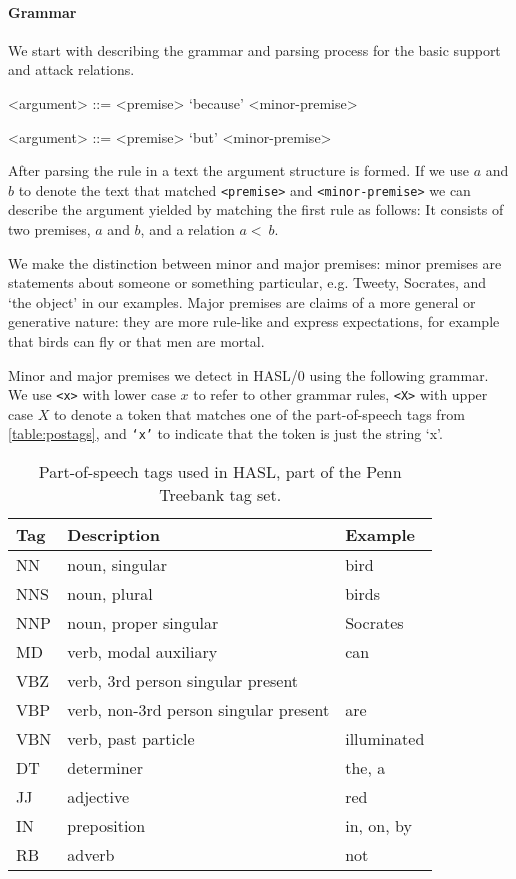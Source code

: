 \paragraph{Grammar} We start with describing the grammar and parsing process for the basic support and attack relations.

\begin{grammar}
<argument> ::= <premise> `because' <minor-premise> %

<argument> ::= <premise> `but' <minor-premise> %
\end{grammar}

\noindent After parsing the rule in a text the argument structure is formed. If we use $a$ and $b$ to denote the text that matched \texttt{<premise>} and \texttt{<minor-premise>} we can describe the argument yielded by matching the first rule as follows: It consists of two premises, $a$ and $b$, and a relation $a <~ b$.

We make the distinction between minor and major premises: minor premises are statements about someone or something particular, e.g. Tweety, Socrates, and `the object' in our examples. Major premises are claims of a more general or generative nature: they are more rule-like and express expectations, for example that birds can fly or that men are mortal.

Minor and major premises we detect in HASL/0 using the following grammar. We use \texttt{<x>} with lower case $x$ to refer to other grammar rules, \texttt{<X>} with upper case $X$ to denote a token that matches one of the part-of-speech tags from \autoref{table:postags}, and \texttt{`x'} to indicate that the token is just the string `x'.

\begin{table}
    \begin{tabular}{lll}
        Tag & Description & Example \\
        \hline
        NN  & noun, singular & bird \\
        NNS & noun, plural & birds \\
        NNP & noun, proper singular & Socrates \\
        MD  & verb, modal auxiliary & can \\
        VBZ & verb, 3rd person singular present \\
        VBP & verb, non-3rd person singular present & are \\
        VBN & verb, past particle & illuminated \\
        DT  & determiner & the, a \\
        JJ  & adjective & red \\
        IN  & preposition & in, on, by \\
        RB  & adverb & not
    \end{tabular}
    \caption{Part-of-speech tags used in HASL, part of the Penn Treebank tag set.}
    \label{table:postags}
\end{table}

